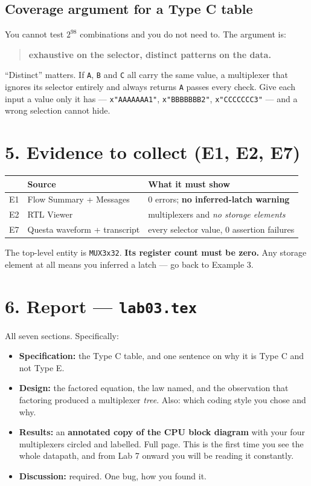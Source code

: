 \documentclass[11pt]{article}
\newcommand{\code}[1]{\texttt{#1}}
\begin{document}
\subsection*{Coverage argument for a Type C table}

You cannot test $2^{98}$ combinations and you do not need to. The argument is:

\begin{quote}
\textbf{exhaustive on the selector, distinct patterns on the data.}
\end{quote}

``Distinct'' matters. If \code{A}, \code{B} and \code{C} all carry the same value,
a multiplexer that ignores its selector entirely and always returns \code{A}
passes every check. Give each input a value only it has --- \code{x"AAAAAAA1"},
\code{x"BBBBBBB2"}, \code{x"CCCCCCC3"} --- and a wrong selection cannot hide.

\section*{5. Evidence to collect (E1, E2, E7)}

\begin{center}
\begin{tabular}{lll}
\toprule
& Source & What it must show \\
\midrule
E1 & Flow Summary + Messages & 0 errors; \textbf{no inferred-latch warning} \\
E2 & RTL Viewer & multiplexers and \emph{no storage elements} \\
E7 & Questa waveform + transcript & every selector value, 0 assertion failures \\
\bottomrule
\end{tabular}
\end{center}

The top-level entity is \code{MUX3x32}. \textbf{Its register count must be zero.}
Any storage element at all means you inferred a latch --- go back to Example 3.

\section*{6. Report --- \code{lab03.tex}}

All seven sections. Specifically:

\begin{itemize}[leftmargin=1.6em,itemsep=1pt]
\item \textbf{Specification:} the Type C table, and one sentence on why it is
Type C and not Type E.
\item \textbf{Design:} the factored equation, the law named, and the observation
that factoring produced a multiplexer \emph{tree}. Also: which coding style you
chose and why.
\item \textbf{Results:} an \textbf{annotated copy of the CPU block diagram} with
your four multiplexers circled and labelled. Full page. This is the first time
you see the whole datapath, and from Lab 7 onward you will be reading it
constantly.
\item \textbf{Discussion:} required. One bug, how you found it.
\end{itemize}
\end{document}

